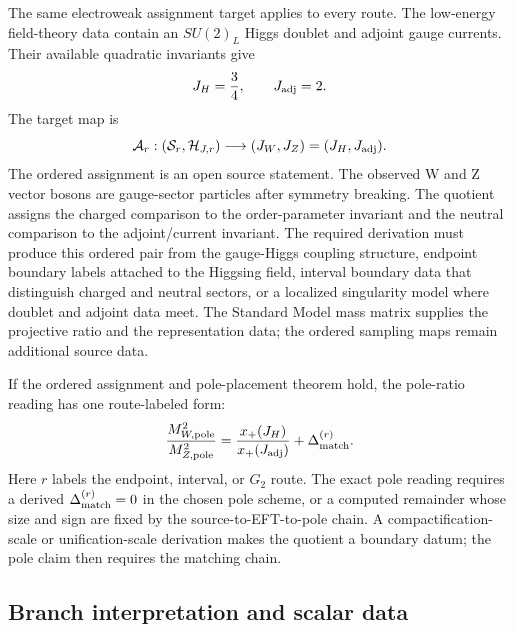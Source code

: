 The same electroweak assignment target applies to every route.  The low-energy field-theory data contain an \(SU(2)_L\) Higgs doublet and adjoint gauge currents.  Their available quadratic invariants give
\begin{equation}
  J_H=\frac34,\qquad J_{\rm adj}=2.
  \label{eq:route-j-invariants}
\end{equation}
The target map is
\begin{equation}
  \mathcal A_r:
  (\mathcal S_r,\mathcal H_{J,r})
  \longrightarrow
  (J_W,J_Z)=(J_H,J_{\rm adj}).
  \label{eq:route-assignment-map}
\end{equation}
The ordered assignment is an open source statement.  The observed W and Z vector bosons
are gauge-sector particles after symmetry breaking.  The quotient assigns the
charged comparison to the order-parameter invariant and the neutral comparison
to the adjoint/current invariant.  The required derivation must produce this
ordered pair from the gauge-Higgs coupling structure, endpoint boundary labels
attached to the Higgsing field, interval boundary data that distinguish charged
and neutral sectors, or a localized singularity model where doublet and adjoint
data meet.
The Standard Model mass matrix supplies the projective ratio and the
representation data; the ordered sampling maps remain additional source data.

If the ordered assignment and pole-placement theorem hold, the pole-ratio
reading has one route-labeled form:
\begin{equation}
  \frac{M_{W,\rm pole}^2}{M_{Z,\rm pole}^2}
  =
  \frac{x_+(J_H)}{x_+(J_{\rm adj})}
  +\Delta^{(r)}_{\rm match}.
  \label{eq:route-matching-remainder}
\end{equation}
Here \(r\) labels the endpoint, interval, or \(G_2\) route.  The exact pole
reading requires a derived \(\Delta^{(r)}_{\rm match}=0\) in the chosen pole
scheme, or a computed remainder whose size and sign are fixed by the
source-to-EFT-to-pole chain.  A compactification-scale or unification-scale
derivation makes the quotient a boundary datum; the pole claim then requires
the matching chain.

\subsection{Branch interpretation and scalar data}
\label{sec:route-branch-interpretation}

